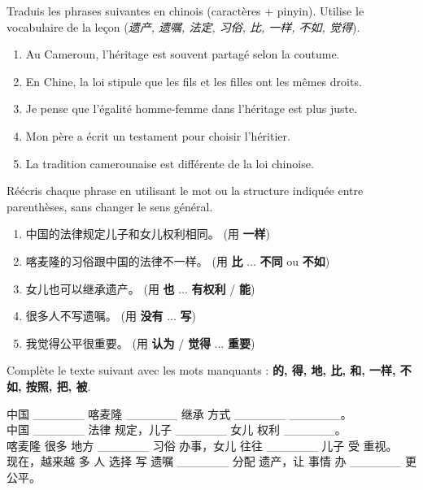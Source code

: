 \documentclass[11pt]{article}
\newcounter{popsec}
\newcounter{popsub}
\newcommand{\courssub}[1]{%
  \stepcounter{popsub}%
  \par\vspace{9pt}\noindent{\popxbold\fontsize{11.5}{13}\selectfont\color{popink}{\color{poporange}\thepopsec.\thepopsub}\hspace{6pt}#1}\par\nopagebreak\vspace{4pt}
}
\begin{document}
\courssub{Je m'entraîne}

\begin{exercice}
Traduis les phrases suivantes en chinois (caractères + pinyin). Utilise le vocabulaire de la leçon (\emph{遗产, 遗嘱, 法定, 习俗, 比, 一样, 不如, 觉得}).
\begin{enumerate}
    \item Au Cameroun, l'héritage est souvent partagé selon la coutume.
    \item En Chine, la loi stipule que les fils et les filles ont les mêmes droits.
    \item Je pense que l'égalité homme-femme dans l'héritage est plus juste.
    \item Mon père a écrit un testament pour choisir l'héritier.
    \item La tradition camerounaise est différente de la loi chinoise.
\end{enumerate}
\end{exercice}

\begin{exercice}
Réécris chaque phrase en utilisant le mot ou la structure indiquée entre parenthèses, sans changer le sens général.
\begin{enumerate}
    \item 中国的法律规定儿子和女儿权利相同。 (用 \textbf{一样})
    \item 喀麦隆的习俗跟中国的法律不一样。 (用 \textbf{比} ... \textbf{不同} ou \textbf{不如})
    \item 女儿也可以继承遗产。 (用 \textbf{也} ... \textbf{有权利} / \textbf{能})
    \item 很多人不写遗嘱。 (用 \textbf{没有} ... \textbf{写})
    \item 我觉得公平很重要。 (用 \textbf{认为} / \textbf{觉得} ... \textbf{重要})
\end{enumerate}
\end{exercice}

\begin{exercice}
Complète le texte suivant avec les mots manquants : \textbf{的, 得, 地, 比, 和, 一样, 不如, 按照, 把, 被}.

\begin{textebox}
中国 \_\_\_\_\_\_ 喀麦隆 \_\_\_\_\_\_ 继承 方式 \_\_\_\_\_\_ \_\_\_\_\_\_。\\
中国 \_\_\_\_\_\_ 法律 规定，儿子 \_\_\_\_\_\_ 女儿 权利 \_\_\_\_\_\_。\\
喀麦隆 很多 地方 \_\_\_\_\_\_ 习俗 办事，女儿 往往 \_\_\_\_\_\_ 儿子 受 重视。\\
现在，越来越 多 人 选择 写 遗嘱 \_\_\_\_\_\_ 分配 遗产，让 事情 办 \_\_\_\_\_\_ 更 公平。
\end{textebox}
\end{exercice}
\end{document}
